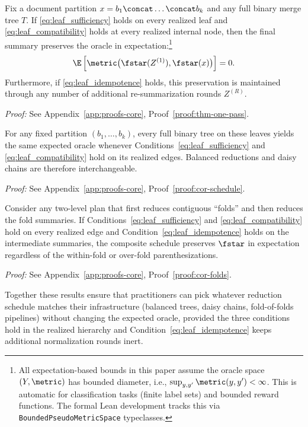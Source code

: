 \begin{theorem}\label{thm:one-pass}
Fix a document partition $x = b_1 \concat \dots \concat b_k$ and any full binary merge tree $T$. If \ref{eq:leaf_sufficiency} holds on every realized leaf and \ref{eq:leaf_compatibility} holds at every realized internal node, then the final summary preserves the oracle in expectation:\footnote{All expectation-based bounds in this paper assume the oracle space $(Y,\metric)$ has bounded diameter, i.e., $\sup_{y,y'}\metric(y,y')<\infty$. This is automatic for classification tasks (finite label sets) and bounded reward functions. The formal Lean development tracks this via \texttt{BoundedPseudoMetricSpace} typeclasses.}
\[
\E\left[\metric\big(\fstar(Z^{(1)}), \fstar(x)\big)\right] = 0.
\]
Furthermore, if \ref{eq:leaf_idempotence} holds, this preservation is maintained through any number of additional re-summarization rounds $Z^{(R)}$.
\end{theorem}

\noindent\textit{Proof:} See Appendix~\ref{app:proofs-core}, Proof~\ref{proof:thm-one-pass}.

\begin{corollary}\label{cor:schedule}
For any fixed partition $(b_1,\ldots,b_k)$, every full binary tree on these leaves yields the same expected oracle whenever Conditions~\eqref{eq:leaf_sufficiency} and \eqref{eq:leaf_compatibility} hold on its realized edges. Balanced reductions and daisy chains are therefore interchangeable.
\end{corollary}

\noindent\textit{Proof:} See Appendix~\ref{app:proofs-core}, Proof~\ref{proof:cor-schedule}.

\begin{corollary}\label{cor:folds}
Consider any two-level plan that first reduces contiguous ``folds'' and then reduces the fold summaries. If Conditions~\eqref{eq:leaf_sufficiency} and \eqref{eq:leaf_compatibility} hold on every realized edge and Condition~\eqref{eq:leaf_idempotence} holds on the intermediate summaries, the composite schedule preserves $\fstar$ in expectation regardless of the within-fold or over-fold parenthesizations.
\end{corollary}

\noindent\textit{Proof:} See Appendix~\ref{app:proofs-core}, Proof~\ref{proof:cor-folds}.

Together these results ensure that practitioners can pick whatever reduction schedule matches their infrastructure (balanced trees, daisy chains, fold-of-folds pipelines) without changing the expected oracle, provided the three conditions hold in the realized hierarchy and Condition~\eqref{eq:leaf_idempotence} keeps additional normalization rounds inert.

